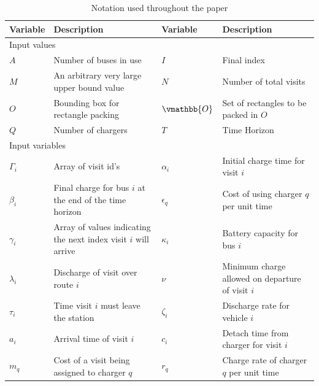 \documentclass[letterpaper, 10pt, conference]{IEEEtran}
\begin{document}
\begin{table}[!t]
	\caption{Notation used throughout the paper}
	\label{tab:variables}
	\centering
	\begin{tabular}{l l l l}
		\toprule
		\textbf{Variable} & \textbf{Description} & \textbf{Variable} & \textbf{Description} \\
		\toprule
		\multicolumn{4}{l}{Input values} \\
			$A$           & Number of buses in use &
			$I$           & Final index                               \\
			$M$           & An arbitrary very large upper bound value &
			$N$           & Number of total visits                    \\
			$O$           & Bounding box for rectangle packing        &
			$\vmathbb{O}$ & Set of rectangles to be packed in \(O\)   \\
			$Q$           & Number of chargers                        &
			$T$           & Time Horizon                              \\
		\hline
		\multicolumn{4}{l}{Input variables} \\
			$\Gamma_i$   & Array of visit id's                                             &
			$\alpha_i$   & Initial charge time for visit  $i$                              \\
			$\beta_{i}$  & Final charge for bus $i$ at the end of the time horizon         &
			$\epsilon_q$ & Cost of using charger $q$ per unit time                         \\
			$\gamma_i$   & Array of values indicating the next index visit $i$ will arrive &
			$\kappa_i$   & Battery capacity for bus \(i\)                                  \\
			$\lambda_i$  & Discharge of visit over route  $i$                              &
			$\nu$        & Minimum charge allowed on departure of visit \(i\)              \\
			$\tau_i$     & Time visit $i$ must leave the station                           &
			$\zeta_i$    & Discharge rate for vehicle \(i\)                                \\
			$a_i$        & Arrival time of visit  $i$                                      &
			$c_i$        & Detach time from charger for visit \(i\)                        \\
			$m_q$        & Cost of a visit being assigned to charger  $q$                  &
			$r_q$        & Charge rate of charger $q$ per unit time                        \\

\end{tabular}
\end{table}
\end{document}
